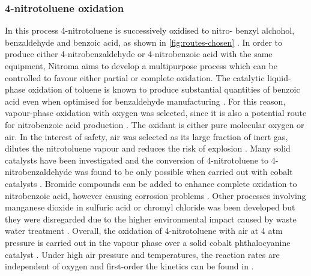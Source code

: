 \subsubsection{4-nitrotoluene oxidation}
In this process 4-nitrotoluene is successively oxidised to nitro- benzyl alchohol, benzaldehyde and benzoic acid, as shown in \cref{fig:routes-chosen} \cite{hoorn_modelling_2005}. In order to produce either 4-nitrobenzaldehyde or 4-nitrobenzoic acid with the same equipment, Nitroma aims to develop a multipurpose process which can be controlled to favour either partial or complete oxidation. 
The catalytic liquid-phase oxidation of toluene is known to produce substantial quantities of benzoic acid even when optimised for benzaldehyde manufacturing \cite{bruhne_benzaldehyde_2011}. For this reason, vapour-phase oxidation with oxygen was selected, since it is also a potential route for nitrobenzoic acid production \cite{maki_benzoic_2000}. 
The oxidant is either pure molecular oxygen or air. In the interest of safety, air was selected as its large fraction of inert  gas, dilutes the nitrotoluene vapour and reduces the risk of explosion \cite{bruhne_benzaldehyde_2011}. 
Many solid catalysts have been investigated and the conversion of 4-nitrotoluene to 4-nitrobenzaldehyde was found to be only possible when carried out with cobalt catalysts \cite{wendt_reaction_1986}. Bromide compounds can be added to enhance complete oxidation to nitrobenzoic acid, however causing corrosion problems \cite{opgrande_benzoic_2003}. Other processes involving manganese dioxide in sulfuric acid or chromyl chloride was been developed but they were disregarded due to the higher environmental impact caused by waste water treatment \cite{bruhne_benzaldehyde_2011}.
Overall, the oxidation of 4-nitrotoluene with air at 4 atm pressure is carried out in the vapour phase over a solid cobalt phthalocyanine catalyst \cite{chandalia_kinetics_1999}. Under high air pressure and temperatures, the reaction rates are independent of oxygen and first-order the kinetics can be found in \cite{tan_kinetic_2010}.


